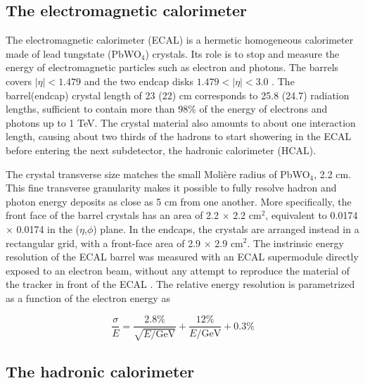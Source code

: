 \subsection{The electromagnetic calorimeter}

The electromagnetic calorimeter (ECAL) \cite{CERN-LHCC-97-033,Bloch:581342} is a hermetic homogeneous calorimeter made of lead tungstate (PbWO$_4$) crystals. Its role is to stop and measure the energy of electromagnetic particles such as electron and photons. The barrels covers $|\eta| < 1.479$ and the two endcap disks $1.479 < |\eta| < 3.0$ . The barrel(endcap) crystal length of 23 (22) cm corresponds to 25.8 (24.7) radiation lengths, sufficient to contain more than $98\%$ of the energy of electrons and photons up to 1 TeV. The crystal material also amounts to about one interaction length, causing about two thirds of the hadrons to start showering in the ECAL before entering the next subdetector, the hadronic calorimeter (HCAL).

The crystal transverse size matches the small Molière radius of PbWO$_4$, 2.2 cm. This fine transverse granularity makes it possible to fully resolve hadron and photon energy deposits as close as 5 cm from one another. More specifically, the front face of the barrel crystals has an area of 2.2 $\times$ 2.2 cm$^2$, equivalent to 0.0174 $\times$ 0.0174 in the ($\eta$,$\phi$) plane. In the endcaps, the crystals are arranged instead in a rectangular grid, with a front-face area of 2.9 $\times$ 2.9 cm$^2$. The instrinsic energy resolution of the ECAL barrel was measured with an ECAL supermodule directly exposed to an electron beam, without any attempt to reproduce the material of the tracker in front of the ECAL \cite{Ingram_2007}. The relative energy resolution is parametrized as a function of the electron energy as 

\begin{equation}
    \frac{\sigma}{E} = \frac{2.8\%}{\sqrt{E / \mathrm{GeV}}} + \frac{12\%}{E / \mathrm{GeV}} + 0.3\%
\end{equation}

\subsection{The hadronic calorimeter}


